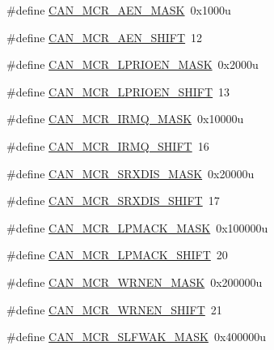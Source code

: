 \begin{DoxyCompactItemize}
\item 
\#define \hyperlink{group___c_a_n___register___masks_gaf788111bd2bf9a69160d0a0cb713c926}{C\+A\+N\+\_\+\+M\+C\+R\+\_\+\+A\+E\+N\+\_\+\+M\+A\+SK}~0x1000u
\item 
\#define \hyperlink{group___c_a_n___register___masks_ga6c610bd65cb9471ad0ca511dbe2c86d4}{C\+A\+N\+\_\+\+M\+C\+R\+\_\+\+A\+E\+N\+\_\+\+S\+H\+I\+FT}~12
\item 
\#define \hyperlink{group___c_a_n___register___masks_ga1420cc0cb40d414296a741397ee07116}{C\+A\+N\+\_\+\+M\+C\+R\+\_\+\+L\+P\+R\+I\+O\+E\+N\+\_\+\+M\+A\+SK}~0x2000u
\item 
\#define \hyperlink{group___c_a_n___register___masks_gaaf89fabb5183062196edf8dc4a3f6770}{C\+A\+N\+\_\+\+M\+C\+R\+\_\+\+L\+P\+R\+I\+O\+E\+N\+\_\+\+S\+H\+I\+FT}~13
\item 
\#define \hyperlink{group___c_a_n___register___masks_gad68843c21c6243f255601d8973f4e7eb}{C\+A\+N\+\_\+\+M\+C\+R\+\_\+\+I\+R\+M\+Q\+\_\+\+M\+A\+SK}~0x10000u
\item 
\#define \hyperlink{group___c_a_n___register___masks_gae30b928fb3ce512c48cb0be04af69acd}{C\+A\+N\+\_\+\+M\+C\+R\+\_\+\+I\+R\+M\+Q\+\_\+\+S\+H\+I\+FT}~16
\item 
\#define \hyperlink{group___c_a_n___register___masks_ga29b3d428d19a7204c53f56c7467172f1}{C\+A\+N\+\_\+\+M\+C\+R\+\_\+\+S\+R\+X\+D\+I\+S\+\_\+\+M\+A\+SK}~0x20000u
\item 
\#define \hyperlink{group___c_a_n___register___masks_gae2513ad87a72bc6f2bb88be59a3e0836}{C\+A\+N\+\_\+\+M\+C\+R\+\_\+\+S\+R\+X\+D\+I\+S\+\_\+\+S\+H\+I\+FT}~17
\item 
\#define \hyperlink{group___c_a_n___register___masks_ga599f0c162d665f019269aace68e3fb17}{C\+A\+N\+\_\+\+M\+C\+R\+\_\+\+L\+P\+M\+A\+C\+K\+\_\+\+M\+A\+SK}~0x100000u
\item 
\#define \hyperlink{group___c_a_n___register___masks_ga3bd209cf2829ba4c96fc00ec18c6e2d6}{C\+A\+N\+\_\+\+M\+C\+R\+\_\+\+L\+P\+M\+A\+C\+K\+\_\+\+S\+H\+I\+FT}~20
\item 
\#define \hyperlink{group___c_a_n___register___masks_ga235a7c2b04cfd0765fa2a9313fc1fcd1}{C\+A\+N\+\_\+\+M\+C\+R\+\_\+\+W\+R\+N\+E\+N\+\_\+\+M\+A\+SK}~0x200000u
\item 
\#define \hyperlink{group___c_a_n___register___masks_ga728f73a79721a9cc4b1b82ce6eaa74a7}{C\+A\+N\+\_\+\+M\+C\+R\+\_\+\+W\+R\+N\+E\+N\+\_\+\+S\+H\+I\+FT}~21
\item 
\#define \hyperlink{group___c_a_n___register___masks_gacf4f1d3d5d5eccf0f03f5f5ed4dc1bba}{C\+A\+N\+\_\+\+M\+C\+R\+\_\+\+S\+L\+F\+W\+A\+K\+\_\+\+M\+A\+SK}~0x400000u

\end{DoxyCompactItemize}
